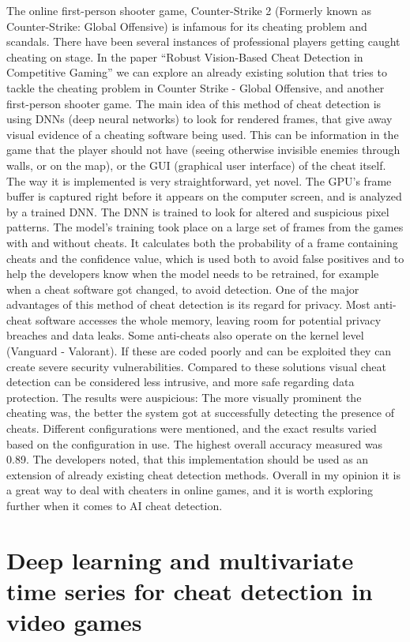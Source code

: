 The online first-person shooter game, Counter-Strike 2 (Formerly known as Counter-Strike:
Global Offensive) is infamous for its cheating problem and scandals. There have been several
instances of professional players getting caught cheating on stage.
In the paper “Robust Vision-Based Cheat Detection in Competitive Gaming” we can explore an
already existing solution that tries to tackle the cheating problem in Counter Strike - Global
Offensive, and another first-person shooter game. The main idea of this method of cheat
detection is using DNNs (deep neural networks) to look for rendered frames, that give away
visual evidence of a cheating software being used. This can be information in the game that the
player should not have (seeing otherwise invisible enemies through walls, or on the map), or the
GUI (graphical user interface) of the cheat itself.
The way it is implemented is very straightforward, yet novel. The GPU’s frame buffer is captured
right before it appears on the computer screen, and is analyzed by a trained DNN. The DNN is
trained to look for altered and suspicious pixel patterns. The model's training took place on a
large set of frames from the games with and without cheats. It calculates both the probability of
a frame containing cheats and the confidence value, which is used both to avoid false positives
and to help the developers know when the model needs to be retrained, for example when a
cheat software got changed, to avoid detection.
One of the major advantages of this method of cheat detection is its regard for privacy. Most
anti-cheat software accesses the whole memory, leaving room for potential privacy breaches
and data leaks. Some anti-cheats also operate on the kernel level (Vanguard - Valorant). If these
are coded poorly and can be exploited they can create severe security vulnerabilities. Compared
to these solutions visual cheat detection can be considered less intrusive, and more safe
regarding data protection.
The results were auspicious: The more visually prominent the cheating was, the better the
system got at successfully detecting the presence of cheats. Different configurations were
mentioned, and the exact results varied based on the configuration in use. The highest overall
accuracy measured was 0.89.
The developers noted, that this implementation should be used as an extension of already
existing cheat detection methods. Overall in my opinion it is a great way to deal with cheaters in
online games, and it is worth exploring further when it comes to AI cheat detection.

\section{Deep learning and multivariate time series for cheat detection in video games \cite{pinto2021deep}}

